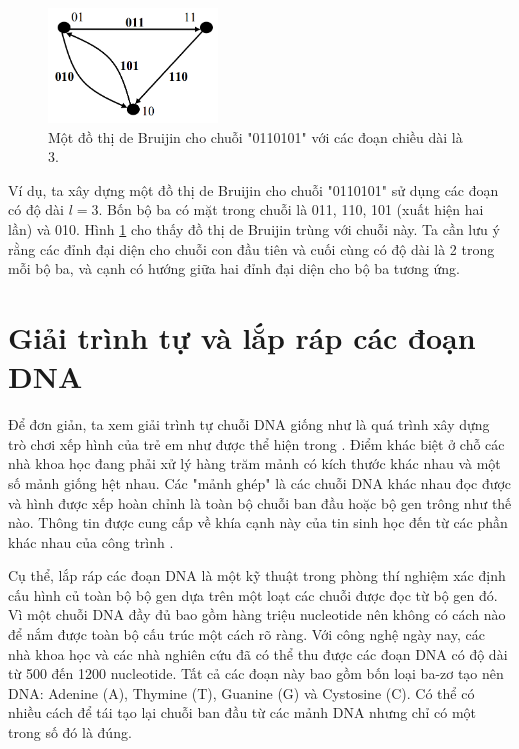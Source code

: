 \documentclass[14pt, a4paper]{article}
\numberwithin{equation}{section}
\numberwithin{figure}{section}
\numberwithin{dl}{section}
\numberwithin{md}{section}
\numberwithin{bd}{section}
\numberwithin{dn}{section}
\numberwithin{hq}{section}
\begin{document}
    \begin{figure}[h!]
        \centering
        \includegraphics[width=0.4\textwidth]{1.png}
        \caption{Một đồ thị de Bruijin cho chuỗi "0110101" với các đoạn chiều dài là 3.}
        \label{fig:1}
    \end{figure}

    Ví dụ, ta xây dựng một đồ thị de Bruijin cho chuỗi "0110101" sử dụng các đoạn có độ dài $l=3$.
    Bốn bộ ba có mặt trong chuỗi là 011, 110, 101 (xuất hiện hai lần) và 010.
    Hình \ref{fig:1} cho thấy đồ thị de Bruijin trùng với chuỗi này.
    Ta cần lưu ý rằng các đỉnh đại diện cho chuỗi con đầu tiên và cuối cùng có độ dài là 2 trong mỗi bộ ba, và cạnh có hướng giữa hai đỉnh đại diện cho bộ ba tương ứng.

    \section{Giải trình tự và lắp ráp các đoạn DNA}

    Để đơn giản, ta xem giải trình tự chuỗi DNA giống như là quá trình xây dựng trò chơi xếp hình của trẻ em như được thể hiện trong \cite{pevzner2001eulerian}.
    Điểm khác biệt ở chỗ các nhà khoa học đang phải xử lý hàng trăm mảnh có kích thước khác nhau và một số mảnh giống hệt nhau.
    Các "mảnh ghép" là các chuỗi DNA khác nhau đọc được và hình được xếp hoàn chỉnh là toàn bộ chuỗi ban đầu hoặc bộ gen trông như thế nào.
    Thông tin được cung cấp về khía cạnh này của tin sinh học đến từ các phần khác nhau của công trình \cite{jones2004introduction}.

    Cụ thể, lắp ráp các đoạn DNA là một kỹ thuật trong phòng thí nghiệm xác định cấu hình củ toàn bộ bộ gen dựa trên một loạt các chuỗi được đọc từ bộ gen đó.
    Vì một chuỗi DNA đầy đủ bao gồm hàng triệu nucleotide nên không có cách nào để nắm được toàn bộ cấu trúc một cách rõ ràng.
    Với công nghệ ngày nay, các nhà khoa học và các nhà nghiên cứu đã có thể thu được các đoạn DNA có độ dài từ 500 đến 1200 nucleotide.
    Tất cả các đoạn này bao gồm bốn loại ba-zơ tạo nên DNA: Adenine (A), Thymine (T), Guanine (G) và Cystosine (C).
    Có thể có nhiều cách để tái tạo lại chuỗi ban đầu từ các mảnh DNA nhưng chỉ có một trong số đó là đúng.
\end{document}
